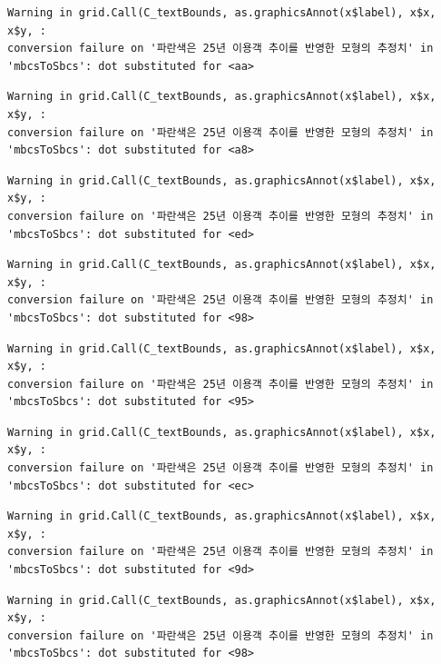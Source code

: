 \documentclass[
  letterpaper,
  DIV=11,
  numbers=noendperiod]{scrreprt}
\begin{document}
\begin{verbatim}
Warning in grid.Call(C_textBounds, as.graphicsAnnot(x$label), x$x, x$y, :
conversion failure on '파란색은 25년 이용객 추이를 반영한 모형의 추정치' in
'mbcsToSbcs': dot substituted for <aa>
\end{verbatim}

\begin{verbatim}
Warning in grid.Call(C_textBounds, as.graphicsAnnot(x$label), x$x, x$y, :
conversion failure on '파란색은 25년 이용객 추이를 반영한 모형의 추정치' in
'mbcsToSbcs': dot substituted for <a8>
\end{verbatim}

\begin{verbatim}
Warning in grid.Call(C_textBounds, as.graphicsAnnot(x$label), x$x, x$y, :
conversion failure on '파란색은 25년 이용객 추이를 반영한 모형의 추정치' in
'mbcsToSbcs': dot substituted for <ed>
\end{verbatim}

\begin{verbatim}
Warning in grid.Call(C_textBounds, as.graphicsAnnot(x$label), x$x, x$y, :
conversion failure on '파란색은 25년 이용객 추이를 반영한 모형의 추정치' in
'mbcsToSbcs': dot substituted for <98>
\end{verbatim}

\begin{verbatim}
Warning in grid.Call(C_textBounds, as.graphicsAnnot(x$label), x$x, x$y, :
conversion failure on '파란색은 25년 이용객 추이를 반영한 모형의 추정치' in
'mbcsToSbcs': dot substituted for <95>
\end{verbatim}

\begin{verbatim}
Warning in grid.Call(C_textBounds, as.graphicsAnnot(x$label), x$x, x$y, :
conversion failure on '파란색은 25년 이용객 추이를 반영한 모형의 추정치' in
'mbcsToSbcs': dot substituted for <ec>
\end{verbatim}

\begin{verbatim}
Warning in grid.Call(C_textBounds, as.graphicsAnnot(x$label), x$x, x$y, :
conversion failure on '파란색은 25년 이용객 추이를 반영한 모형의 추정치' in
'mbcsToSbcs': dot substituted for <9d>
\end{verbatim}

\begin{verbatim}
Warning in grid.Call(C_textBounds, as.graphicsAnnot(x$label), x$x, x$y, :
conversion failure on '파란색은 25년 이용객 추이를 반영한 모형의 추정치' in
'mbcsToSbcs': dot substituted for <98>
\end{verbatim}
\end{document}
